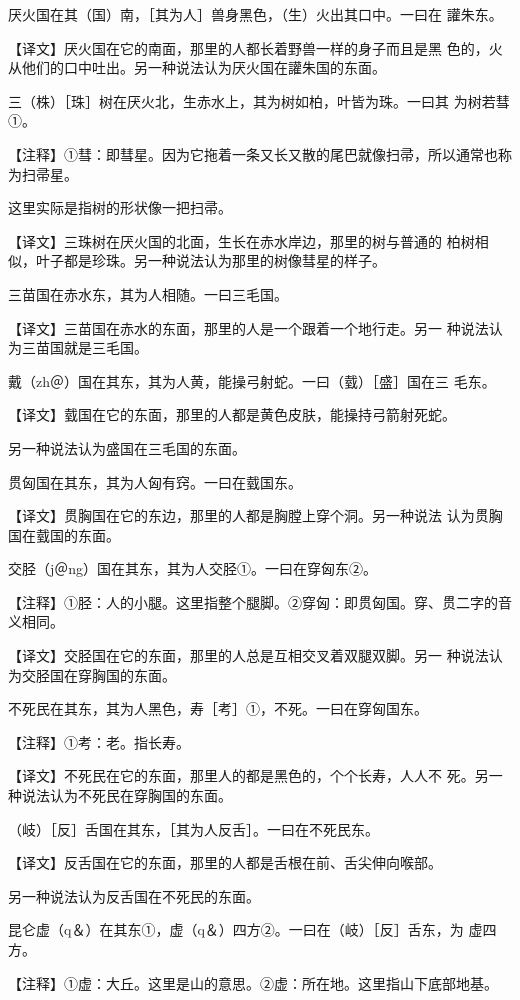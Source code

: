 \documentclass[a4paper,12pt,UTF8,twoside]{ctexbook}
\begin{document}
厌火国在其（国）南，［其为人］兽身黑色，（生）火出其口中。一曰在 讙朱东。

【译文】厌火国在它的南面，那里的人都长着野兽一样的身子而且是黑 色的，火从他们的口中吐出。另一种说法认为厌火国在讙朱国的东面。

三（株）［珠］树在厌火北，生赤水上，其为树如柏，叶皆为珠。一曰其 为树若彗①。

【注释】①彗：即彗星。因为它拖着一条又长又散的尾巴就像扫帚，所以通常也称为扫帚星。

这里实际是指树的形状像一把扫帚。

【译文】三珠树在厌火国的北面，生长在赤水岸边，那里的树与普通的 柏树相似，叶子都是珍珠。另一种说法认为那里的树像彗星的样子。

三苗国在赤水东，其为人相随。一曰三毛国。

【译文】三苗国在赤水的东面，那里的人是一个跟着一个地行走。另一 种说法认为三苗国就是三毛国。

戴（zh＠）国在其东，其为人黄，能操弓射蛇。一曰（臷）［盛］国在三 毛东。

【译文】臷国在它的东面，那里的人都是黄色皮肤，能操持弓箭射死蛇。

另一种说法认为盛国在三毛国的东面。

贯匈国在其东，其为人匈有窍。一曰在臷国东。

【译文】贯胸国在它的东边，那里的人都是胸膛上穿个洞。另一种说法 认为贯胸国在臷国的东面。

交胫（j＠ng）国在其东，其为人交胫①。一曰在穿匈东②。

【注释】①胫：人的小腿。这里指整个腿脚。②穿匈：即贯匈国。穿、贯二字的音义相同。

【译文】交胫国在它的东面，那里的人总是互相交叉着双腿双脚。另一 种说法认为交胫国在穿胸国的东面。

不死民在其东，其为人黑色，寿［考］①，不死。一曰在穿匈国东。

【注释】①考：老。指长寿。

【译文】不死民在它的东面，那里人的都是黑色的，个个长寿，人人不 死。另一种说法认为不死民在穿胸国的东面。

（岐）［反］舌国在其东，［其为人反舌］。一曰在不死民东。

【译文】反舌国在它的东面，那里的人都是舌根在前、舌尖伸向喉部。

另一种说法认为反舌国在不死民的东面。

昆仑虚（q＆）在其东①，虚（q＆）四方②。一曰在（岐）［反］舌东，为 虚四方。

【注释】①虚：大丘。这里是山的意思。②虚：所在地。这里指山下底部地基。
\end{document}
